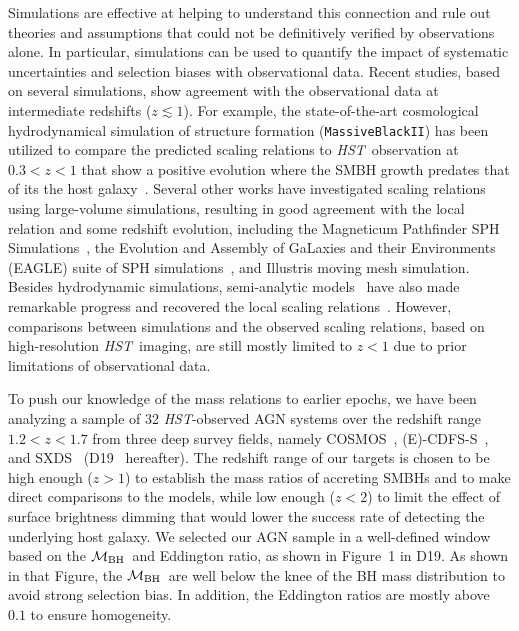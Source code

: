 \documentclass{natureprintstyle}
\newcommand{\hst}{{\it HST}}
\newcommand{\mbh}{$\mathcal M_{\rm BH}$}
\begin{document}
Simulations are effective at helping to understand this connection and rule out theories and assumptions that could not be definitively verified by observations alone. In particular, simulations can be used to quantify the impact of systematic uncertainties and selection biases with observational data. Recent studies, based on several simulations, show agreement with the observational data at intermediate redshifts ($z\lesssim1$). For example, the state-of-the-art cosmological hydrodynamical simulation of structure formation (\texttt{MassiveBlackII}) has been utilized to compare the predicted scaling relations to \hst\ observation at $0.3<z<1$ that show a positive evolution where the SMBH growth predates that of its the host galaxy~\cite{DeG++15}. Several other works have investigated scaling relations using large-volume simulations, resulting in good agreement with the local relation and some redshift evolution, including the Magneticum Pathfinder SPH Simulations~\cite{Steinborn2015}, the Evolution and Assembly of GaLaxies and their Environments (EAGLE) suite of SPH simulations~\cite{Schaye2015}, and Illustris moving mesh simulation\cite{Sijacki2015, Vogelsberger2014, Li2019}. Besides hydrodynamic simulations, semi-analytic models~\cite{Menci2014, Menci2016} have also made remarkable progress and recovered the local scaling relations~\cite{Kormendy13}. However, comparisons between simulations and the observed scaling relations, based on high-resolution \hst\ imaging, are still mostly limited to $z<1$ due to prior limitations of observational data.

To push our knowledge of the mass relations to earlier epochs, we have been analyzing a sample of 32 \hst-observed AGN systems over the redshift range $1.2<z<1.7$ from three deep survey fields, namely COSMOS~\cite{Civano2016}, (E)-CDFS-S~\cite{Lehmer2005, Xue2011}, and SXDS~\cite{Ueda2008} (D19~\cite{Ding2019} hereafter). The redshift range of our targets is chosen to be high enough ($z>1$) to establish the mass ratios of accreting SMBHs and to make direct comparisons to the models, while low enough ($z<2$) to limit the effect of surface brightness dimming that would lower the success rate of detecting the underlying host galaxy. 
We selected our AGN sample in a well-defined window based on the \mbh\ and Eddington ratio, as shown in Figure~1 in D19. As shown in that Figure, the \mbh\ are well below the knee of the BH mass distribution to avoid strong selection bias. In addition, the Eddington ratios are mostly above $0.1$ to ensure homogeneity.
\end{document}
